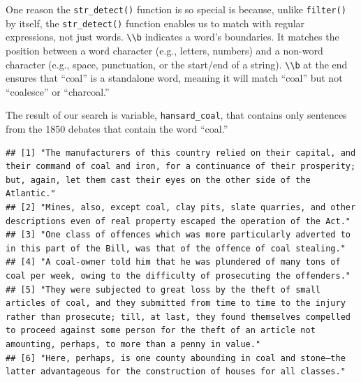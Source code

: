 \documentclass[
]{article}
\newenvironment{Shaded}{\begin{snugshade}}{\end{snugshade}}
\newcommand{\FunctionTok}[1]{\textcolor[rgb]{0.13,0.29,0.53}{\textbf{#1}}}
\newcommand{\NormalTok}[1]{#1}
\newcommand{\SpecialCharTok}[1]{\textcolor[rgb]{0.81,0.36,0.00}{\textbf{#1}}}
\begin{document}
One reason the \texttt{str\_detect()} function is so special is because,
unlike \texttt{filter()} by itself, the \texttt{str\_detect()} function
enables us to match with regular expressions, not just words.
\texttt{\textbackslash{}\textbackslash{}b} indicates a word's
boundaries. It matches the position between a word character (e.g.,
letters, numbers) and a non-word character (e.g., space, punctuation, or
the start/end of a string). \texttt{\textbackslash{}\textbackslash{}b}
at the end ensures that ``coal'' is a standalone word, meaning it will
match ``coal'' but not ``coalesce'' or ``charcoal.''

The result of our search is variable, \texttt{hansard\_coal}, that
contains only sentences from the 1850 debates that contain the word
``coal.''

\begin{Shaded}
\end{Shaded}

\begin{verbatim}
## [1] "The manufacturers of this country relied on their capital, and their command of coal and iron, for a continuance of their prosperity; but, again, let them cast their eyes on the other side of the Atlantic."                                                                                                       
## [2] "Mines, also, except coal, clay pits, slate quarries, and other descriptions even of real property escaped the operation of the Act."                                                                                                                                                                                 
## [3] "One class of offences which was more particularly adverted to in this part of the Bill, was that of the offence of coal stealing."                                                                                                                                                                                   
## [4] "A coal-owner told him that he was plundered of many tons of coal per week, owing to the difficulty of prosecuting the offenders."                                                                                                                                                                                    
## [5] "They were subjected to great loss by the theft of small articles of coal, and they submitted from time to time to the injury rather than prosecute; till, at last, they found themselves compelled to proceed against some person for the theft of an article not amounting, perhaps, to more than a penny in value."
## [6] "Here, perhaps, is one county abounding in coal and stone—the latter advantageous for the construction of houses for all classes."
\end{verbatim}
\end{document}
